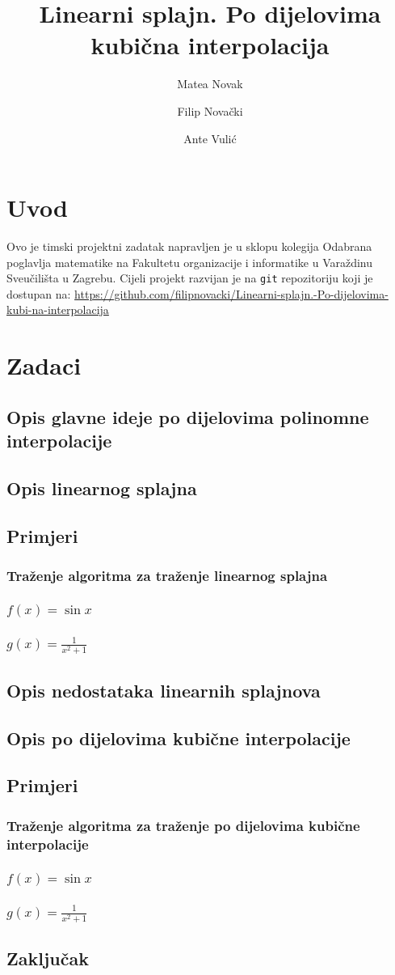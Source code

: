 \documentclass[12pt,a4paper]{report}
\author{Matea Novak \and Filip Novački \and Ante Vulić}
\title{Linearni splajn. Po dijelovima kubična interpolacija}
\begin{document}
	\maketitle
	
	\tableofcontents
	
\chapter{Uvod}
	Ovo je timski projektni zadatak napravljen je u sklopu kolegija Odabrana poglavlja matematike na Fakultetu organizacije i informatike u Varaždinu Sveučilišta u Zagrebu. Cijeli projekt razvijan je na \texttt{git} repozitoriju koji je dostupan na: \url{https://github.com/filipnovacki/Linearni-splajn.-Po-dijelovima-kubi-na-interpolacija}
\chapter{Zadaci}
	\section{Opis glavne ideje po dijelovima polinomne interpolacije}
	\section{Opis linearnog splajna}
	\section{Primjeri}
		\subsection{Traženje algoritma za traženje linearnog splajna}
		\subsection{$f(x)=\sin x$}
		\subsection{$g(x)=\frac{1}{x^2 +1}$}
	\section{Opis nedostataka linearnih splajnova}
	\section{Opis po dijelovima kubične interpolacije}
	\section{Primjeri}
		\subsection{Traženje algoritma za traženje po dijelovima kubične interpolacije}
		\subsection{$f(x)=\sin x$}
		\subsection{$g(x)=\frac{1}{x^2 +1}$}
	\section{Zaključak}
\end{document}
